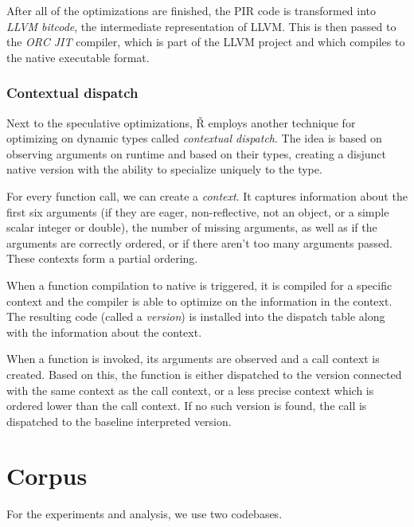 After all of the optimizations are finished, the PIR code is transformed into \textit{LLVM bitcode}, the intermediate representation of LLVM. This is then passed to the \textit{ORC JIT} compiler, which is part of the LLVM project and which compiles to the native executable format.

\subsubsection*{Contextual dispatch}\label{ch:1-ctx-dispatch}

Next to the speculative optimizations, Ř employs another technique for optimizing on dynamic types called \textit{contextual dispatch}\todocite. The idea is based on observing arguments on runtime and based on their types, creating a disjunct native version with the ability to specialize uniquely to the type.

For every function call, we can create a \textit{context}. It captures information about the first six arguments (if they are eager, non-reflective, not an object, or a simple scalar integer or double), the number of missing arguments, as well as if the arguments are correctly ordered, or if there aren’t too many arguments passed. These contexts form a partial ordering.

When a function compilation to native is triggered, it is compiled for a specific context and the compiler is able to optimize on the information in the context. The resulting code (called a \textit{version}) is installed into the dispatch table along with the information about the context.

When a function is invoked, its arguments are observed and a call context is created. Based on this, the function is either dispatched to the version connected with the same context as the call context, or a less precise context which is ordered lower than the call context. If no such version is found, the call is dispatched to the baseline interpreted version.

\section{Corpus}

For the experiments and analysis, we use two codebases.

